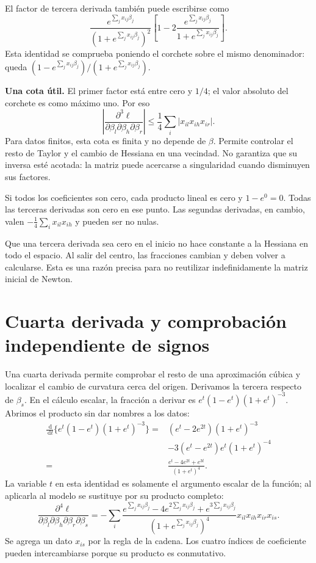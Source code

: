 \documentclass[11pt,a4paper]{article}
\newcommand{\dd}{\,\mathrm d}
\begin{document}
El factor de tercera derivada también puede escribirse como
\[
\frac{e^{\sum_jx_{ij}\beta_j}}{(1+e^{\sum_jx_{ij}\beta_j})^2}
\left[1-2\frac{e^{\sum_jx_{ij}\beta_j}}{1+e^{\sum_jx_{ij}\beta_j}}\right].
\]
Esta identidad se comprueba poniendo el corchete sobre el mismo
denominador: queda $(1-e^{\sum_jx_{ij}\beta_j})/(1+e^{\sum_jx_{ij}\beta_j})$.

\textbf{Una cota útil.}
El primer factor está entre cero y $1/4$; el valor absoluto del
corchete es como máximo uno.
Por eso
\[
\left|\frac{\partial^3\ell}
{\partial\beta_l\partial\beta_h\partial\beta_r}\right|
\le\frac14\sum_i|x_{il}x_{ih}x_{ir}|.
\]
Para datos finitos, esta cota es finita y no depende de $\beta$.
Permite controlar el resto de Taylor y el cambio de Hessiana en
una vecindad. No garantiza que su inversa esté acotada: la matriz
puede acercarse a singularidad cuando disminuyen sus factores.

\begin{ejemplo}
Si todos los coeficientes son cero, cada producto lineal es cero
y $1-e^0=0$. Todas las terceras derivadas son cero en ese punto.
Las segundas derivadas, en cambio, valen
$-\tfrac14\sum_i x_{il}x_{ih}$ y pueden ser no nulas.
\end{ejemplo}
Que una tercera derivada sea cero en el inicio no hace constante
a la Hessiana en todo el espacio.
Al salir del centro, las fracciones cambian y deben volver a calcularse.
Esta es una razón precisa para no reutilizar indefinidamente
la matriz inicial de Newton.

\clearpage
\section{Cuarta derivada y comprobación independiente de signos}\label{logit31}
Una cuarta derivada permite comprobar el resto de una aproximación
cúbica y localizar el cambio de curvatura cerca del origen.
Derivamos la tercera respecto de $\beta_s$.
En el cálculo escalar, la fracción a derivar es
$e^t(1-e^t)(1+e^t)^{-3}$.
Abrimos el producto sin dar nombres a los datos:
\[
\begin{aligned}
\frac{\dd}{\dd t}\{e^t(1-e^t)(1+e^t)^{-3}\}
={}&(e^t-2e^{2t})(1+e^t)^{-3}\\
&-3(e^t-e^{2t})e^t(1+e^t)^{-4}\\
={}&\frac{e^t-4e^{2t}+e^{3t}}{(1+e^t)^4}.
\end{aligned}
\]
La variable $t$ en esta identidad es solamente el argumento escalar de
la función; al aplicarla al modelo se sustituye por su producto completo:
\[
\frac{\partial^4\ell}
{\partial\beta_l\partial\beta_h\partial\beta_r\partial\beta_s}
=-\sum_i
\frac{e^{\sum_jx_{ij}\beta_j}
-4e^{2\sum_jx_{ij}\beta_j}
+e^{3\sum_jx_{ij}\beta_j}}
{(1+e^{\sum_jx_{ij}\beta_j})^4}
x_{il}x_{ih}x_{ir}x_{is}.
\]
Se agrega un dato $x_{is}$ por la regla de la cadena.
Los cuatro índices de coeficiente pueden intercambiarse
porque su producto es conmutativo.
\end{document}
